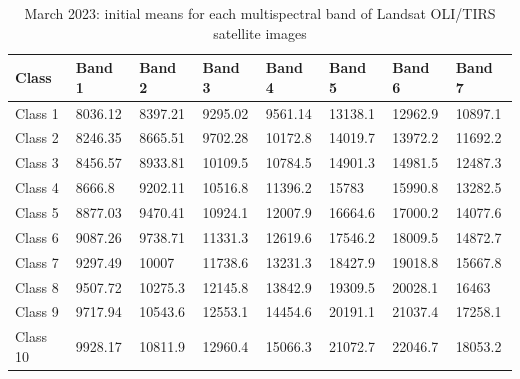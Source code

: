 \documentclass[geomatics,article,submit,pdftex,moreauthors]{Definitions/mdpi}
\begin{document}
\begin{table}[H]
\centering
\begin{tabularx}{\textwidth}{| p{1.5cm} | X | X | X | X | X | X | X | }
  \toprule
   Class & Band 1 & Band 2 & Band 3 & Band 4 & Band 5 & Band 6 & Band 7  \\
   \midrule
    Class 1 & 8036.12 & 8397.21 & 9295.02 & 9561.14 & 13138.1 & 12962.9 & 10897.1 \\
    Class 2 & 8246.35 & 8665.51 & 9702.28 & 10172.8 & 14019.7 & 13972.2 & 11692.2 \\
    Class 3 & 8456.57 & 8933.81 & 10109.5 & 10784.5 & 14901.3 & 14981.5 & 12487.3 \\
    Class 4 & 8666.8 & 9202.11 & 10516.8 & 11396.2 & 15783 & 15990.8 & 13282.5 \\
    Class 5 & 8877.03 & 9470.41 & 10924.1 & 12007.9 & 16664.6 & 17000.2 & 14077.6 \\
    Class 6 & 9087.26 & 9738.71 & 11331.3 & 12619.6 & 17546.2 & 18009.5 & 14872.7 \\
    Class 7 & 9297.49 & 10007 & 11738.6 & 13231.3 & 18427.9 & 19018.8 & 15667.8 \\
    Class 8 & 9507.72 & 10275.3 & 12145.8 & 13842.9 & 19309.5 & 20028.1 & 16463 \\
    Class 9 & 9717.94 & 10543.6 & 12553.1 & 14454.6 & 20191.1 & 21037.4 & 17258.1 \\
    Class 10 & 9928.17 & 10811.9 & 12960.4 & 15066.3 & 21072.7 & 22046.7 & 18053.2 \\
    \bottomrule
\end{tabularx}
\caption{March 2023: initial means for each multispectral band of Landsat OLI/TIRS satellite images}\label{tabA02}
\end{table}
\end{document}
